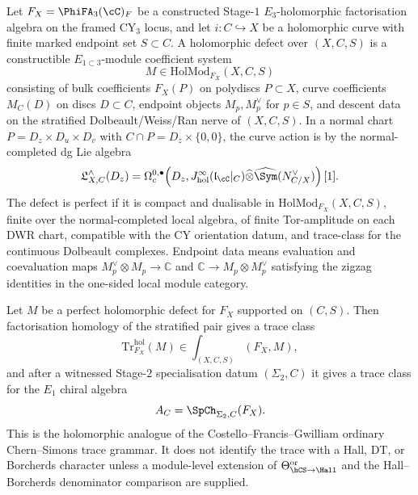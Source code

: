 \begin{definition}
\label{def:cy3-holomorphic-perfect-defect}
Let $F_X=\PhiFA_3(\cC)_F$ be a constructed Stage-$1$
$E_3$-holomorphic factorisation algebra on the framed CY$_3$ locus, and
let $i\colon C\hookrightarrow X$ be a holomorphic curve with finite
marked endpoint set $S\subset C$. A holomorphic defect over $(X,C,S)$ is
a constructible $E_{1\subset 3}$-module coefficient system
\[
 M\in \mathrm{HolMod}_{F_X}(X,C,S)
\]
consisting of bulk coefficients $F_X(P)$ on polydiscs $P\subset X$,
curve coefficients $M_C(D)$ on discs $D\subset C$, endpoint objects
$M_p,M_p^\vee$ for $p\in S$, and descent data on the stratified
Dolbeault/Weiss/Ran nerve of $(X,C,S)$. In a normal chart
$P=D_z\times D_u\times D_v$ with
$C\cap P=D_z\times\{0,0\}$, the curve action is by the
normal-completed dg Lie algebra
\[
 \mathfrak L_{X,C}^{\wedge}(D_z)
 =
 \Omega^{0,\bullet}_c
 \!\left(
 D_z,
 J^\infty_{\mathrm{hol}}(\mathfrak l_{\cC}|_C)
 \widehat\otimes
 \widehat{\Sym}(N_{C/X}^\vee)
 \right)[1].
\]
The defect is perfect if it is compact and dualisable in
$\mathrm{HolMod}_{F_X}(X,C,S)$, finite over the normal-completed local
algebra, of finite Tor-amplitude on each DWR chart, compatible with the
CY orientation datum, and trace-class for the continuous Dolbeault
complexes. Endpoint data means evaluation and coevaluation maps
$M_p^\vee\otimes M_p\to \mathbb C$ and
\(\mathbb C\to M_p\otimes M_p^\vee\) satisfying the zigzag identities in
the one-sided local module category.
\end{definition}

\begin{proposition}
\label{prop:cy3-holomorphic-defect-trace}
Let $M$ be a perfect holomorphic defect for $F_X$ supported on
$(C,S)$. Then factorisation homology of the stratified pair gives a
trace class
\[
 \mathrm{Tr}^{\mathrm{hol}}_{F_X}(M)
 \in
 \int_{(X,C,S)} (F_X,M),
\]
and after a witnessed Stage-$2$ specialisation datum
$(\Sigma_2,C)$ it gives a trace class for the $E_1$ chiral algebra
\[
 A_C=\SpCh_{\Sigma_2,C}(F_X).
\]
This is the holomorphic analogue of the Costello--Francis--Gwilliam
ordinary Chern--Simons trace grammar. It does not identify the trace
with a Hall, DT, or Borcherds character unless a module-level extension
of $\Theta_{\hCS\to\Hall}^{\mathrm{or}}$ and the Hall--Borcherds
denominator comparison are supplied.
\end{proposition}

